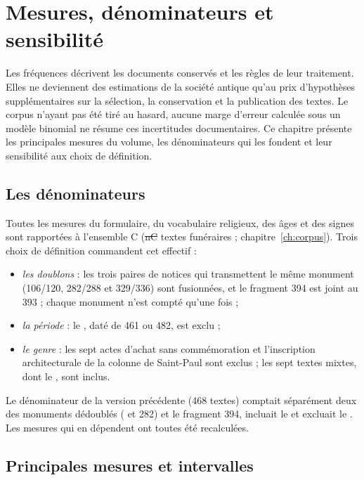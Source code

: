 \chapter{Mesures, dénominateurs et sensibilité}\label{ch:mesures}

Les fréquences décrivent les documents conservés et les règles de leur traitement. Elles ne deviennent des estimations de la société antique qu’au prix d’hypothèses supplémentaires sur la sélection, la conservation et la publication des textes. Le corpus n’ayant pas été tiré au hasard, aucune marge d’erreur calculée sous un modèle binomial ne résume ces incertitudes documentaires. Ce chapitre présente les principales mesures du volume, les dénominateurs qui les fondent et leur sensibilité aux choix de définition.

\section{Les dénominateurs}

Toutes les mesures du formulaire, du vocabulaire religieux, des âges et des signes sont rapportées à l’ensemble C (\st{nC} textes funéraires ; chapitre~\ref{ch:corpus}). Trois choix de définition commandent cet effectif :

\begin{itemize}
\item \emph{les doublons} : les trois paires de notices qui transmettent le même monument (106/120, 282/288 et 329/336) sont fusionnées, et le fragment 394 est joint au 393 ; chaque monument n’est compté qu’une fois ;
\item \emph{la période} : le , daté de 461 ou 482, est exclu ;
\item \emph{le genre} : les sept actes d’achat sans commémoration et l’inscription architecturale de la colonne de Saint-Paul sont exclus ; les sept textes mixtes, dont le , sont inclus.
\end{itemize}

Le dénominateur de la version précédente (468 textes) comptait séparément deux des monuments dédoublés ( et 282) et le fragment 394, incluait le  et excluait le . Les mesures qui en dépendent ont toutes été recalculées.

\section{Principales mesures et intervalles}

